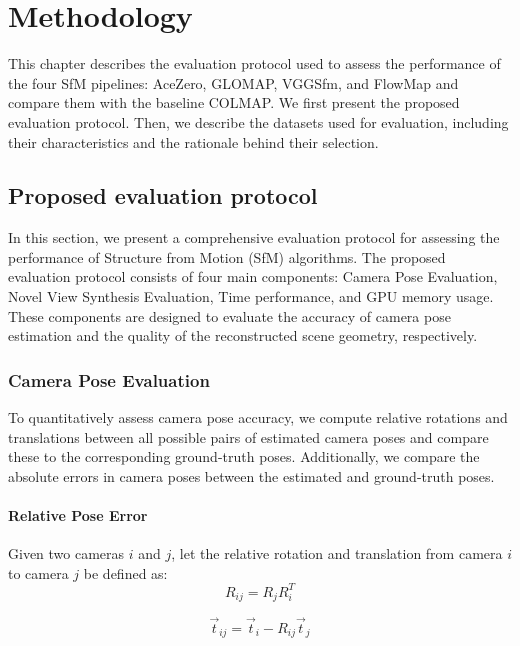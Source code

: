 \chapter{Methodology}\label{chap:methodology}

This chapter describes the evaluation protocol used to assess the performance of the four SfM pipelines: AceZero, GLOMAP, VGGSfm, and FlowMap and compare them with the baseline COLMAP.
We first present the proposed evaluation protocol. Then, we describe the datasets used for evaluation, including their characteristics and the rationale behind their selection.

\section{Proposed evaluation protocol}\label{sec:proposed-evaluation-protocol}

In this section, we present a comprehensive evaluation protocol for assessing the performance of Structure from Motion (SfM) algorithms.
The proposed evaluation protocol consists of four main components: Camera Pose Evaluation, Novel View Synthesis Evaluation, Time performance, and GPU memory usage.
These components are designed to evaluate the accuracy of camera pose estimation and the quality of the reconstructed scene geometry, respectively.

\subsection{Camera Pose Evaluation}\label{sec:camera-pose-evaluation}
To quantitatively assess camera pose accuracy, we compute relative rotations and translations between all possible pairs of estimated camera poses and compare these to the corresponding ground-truth poses.
Additionally, we compare the absolute errors in camera poses between the estimated and ground-truth poses.

\subsubsection{Relative Pose Error}
Given two cameras \( i \) and \( j \), let the relative rotation and translation from camera \( i \) to camera \( j \) be defined as:
\begin{equation}
    R_{ij} = R_j R_i^T
\end{equation}

\begin{equation}
    \vec{t}_{ij} = \vec{t}_i - R_{ij} \vec{t}_j
\end{equation}

